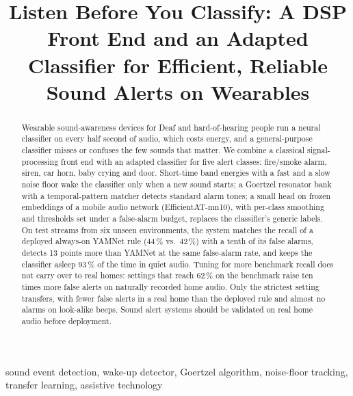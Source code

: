 \documentclass[conference]{IEEEtran}
\begin{document}
\title{Listen Before You Classify: A DSP Front End and an Adapted Classifier for Efficient, Reliable Sound Alerts on Wearables}
\author{}
\maketitle

\begin{abstract}
Wearable sound-awareness devices for Deaf and hard-of-hearing people run a neural classifier on every half second of
audio, which costs energy, and a general-purpose classifier misses or confuses the few sounds that matter. We combine a
classical signal-processing front end with an adapted classifier for five alert classes: fire/smoke alarm, siren, car
horn, baby crying and door. Short-time band energies with a fast and a slow noise floor wake the classifier only when a
new sound starts; a Goertzel resonator bank with a temporal-pattern matcher detects standard alarm tones; a small head
on frozen embeddings of a mobile audio network (EfficientAT-mn10), with per-class smoothing and thresholds set under a
false-alarm budget, replaces the classifier's generic labels. On test streams from six unseen environments, the system
matches the recall of a deployed always-on YAMNet rule (44\,\% vs.\ 42\,\%) with a tenth of its false alarms, detects 13
points more than YAMNet at the same false-alarm rate, and keeps the classifier asleep 93\,\% of the time in quiet audio.
Tuning for more benchmark recall does not carry over to real homes: settings that reach 62\,\% on the benchmark raise ten
times more false alerts on naturally recorded home audio. Only the strictest setting transfers, with fewer false alerts in
a real home than the deployed rule and almost no alarms on look-alike beeps. Sound alert systems should be validated on
real home audio before deployment.
\end{abstract}

\begin{IEEEkeywords}
sound event detection, wake-up detector, Goertzel algorithm, noise-floor tracking, transfer learning, assistive technology
\end{IEEEkeywords}
\end{document}
